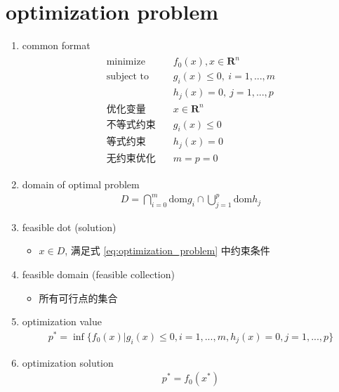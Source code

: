 \documentclass[oneside, 12pt]{ctexbook}
\begin{document}
		\section{\quad optimization problem}
			\begin{enumerate}
				\item common format
					\begin{align}
						\begin{split}
						\text{minimize} \ &f_0(x), x \in \boldsymbol{\text{R}}^n \\
						\text{subject to} \ &g_i(x) \leq 0, \ i=1, ..., m \\
						&h_j(x) = 0, \ j=1, ..., p\\
						\text{优化变量} \quad &x \in \boldsymbol{R}^n \\
						\text{不等式约束} \quad &g_i(x) \leq 0\\
						\text{等式约束} \quad &h_j(x) = 0\\
						\text{无约束优化} \quad &m = p = 0	\label{eq:optimization_problem}									
						\end{split}
					\end{align}
					
				\item domain of optimal problem
					\begin{align}
						D = \bigcap\limits_{i=0}^{m} \text{dom} g_i \cap \bigcup\limits_{j=1}^{p} \text{dom} h_j
					\end{align}
					
				\item feasible dot (solution)
					\begin{itemize}
						\item $x \in D$, 满足式 \ref{eq:optimization_problem} 中约束条件
					\end{itemize}
				
				\item feasible domain (feasible collection)
					\begin{itemize}
						\item 所有可行点的集合 
					\end{itemize}
				
				\item optimization value
					\begin{align}
						p^* = \inf \{ f_0(x) | g_i(x) \leq 0, i=1,...,m, h_j(x)=0,j=1,...,p\}
					\end{align}
					
				\item optimization solution
					\begin{align}
						p^* = f_0(x^*)
					\end{align}
			\end{enumerate}
		
\end{document}
